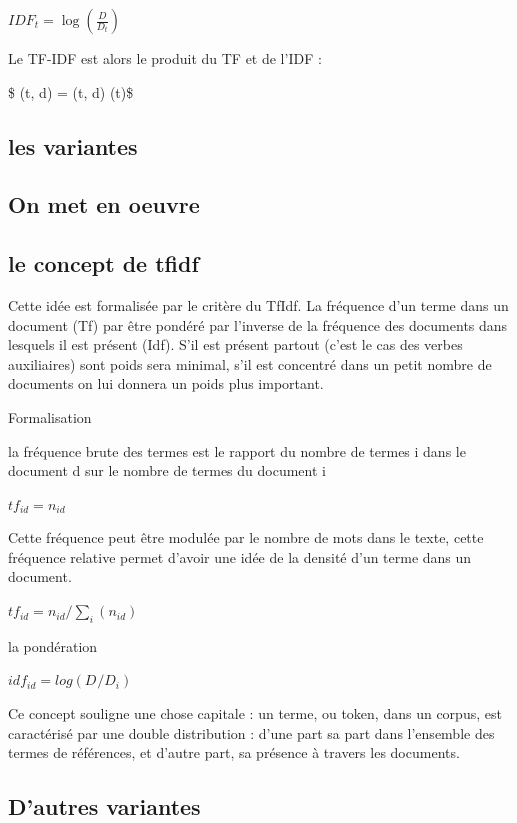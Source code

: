 \documentclass[
  letterpaper,
  DIV=11,
  numbers=noendperiod]{scrreprt}
\begin{document}
\(IDF_{t} = \log (\frac{D}{D_t} )\)

Le TF-IDF est alors le produit du TF et de l'IDF :

\$ (t, d) = (t, d) \times {}(t)\$

\subsection{les variantes}\label{les-variantes}

\subsection{On met en oeuvre}\label{on-met-en-oeuvre}

\subsection{le concept de tfidf}\label{le-concept-de-tfidf}

Cette idée est formalisée par le critère du TfIdf. La fréquence d'un
terme dans un document (Tf) par être pondéré par l'inverse de la
fréquence des documents dans lesquels il est présent (Idf). S'il est
présent partout (c'est le cas des verbes auxiliaires) sont poids sera
minimal, s'il est concentré dans un petit nombre de documents on lui
donnera un poids plus important.

Formalisation

la fréquence brute des termes est le rapport du nombre de termes i dans
le document d sur le nombre de termes du document i

\(tf_{id}= n_{id}\)

Cette fréquence peut être modulée par le nombre de mots dans le texte,
cette fréquence relative permet d'avoir une idée de la densité d'un
terme dans un document.

\(tf_{id}= n_{id}/\sum_{i}(n_{id})\)

la pondération

\(idf_{id}= log(D_{}/D_{i})\)

Ce concept souligne une chose capitale : un terme, ou token, dans un
corpus, est caractérisé par une double distribution : d'une part sa part
dans l'ensemble des termes de références, et d'autre part, sa présence à
travers les documents.

\subsection{D'autres variantes}\label{dautres-variantes}
\end{document}
